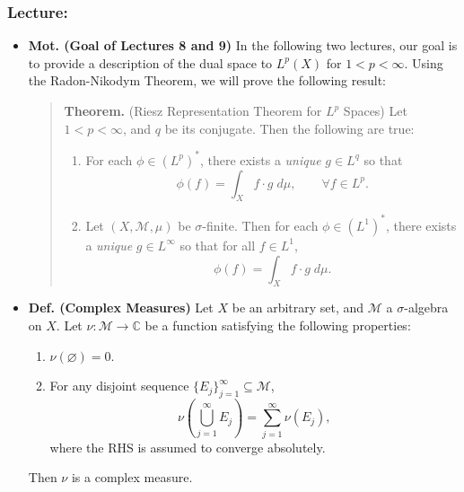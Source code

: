 \documentclass{article}
\begin{document}
\subsubsection{Lecture:}
\begin{itemize}
	\item \textbf{Mot. (Goal of Lectures 8 and 9)} In the following two lectures, our goal is to provide a description of the dual space to $L^{p}(X)$ for $1 < p < \infty$. Using the Radon-Nikodym Theorem, we will prove the following result: 
	\begin{quote}
		\textbf{Theorem.} (Riesz Representation Theorem for $L^{p}$ Spaces) Let $1 < p < \infty$, and $q$ be its conjugate. Then the following are true: \vspace{-0.15cm}
		\begin{enumerate}[itemsep =-2pt,label = (\roman{*})]
			\item For each $\phi \in (L^{p})^{\ast}$, there exists a \textit{unique} $g \in L^{q}$ so that 
			\begin{equation*}
				\phi(f) = \int_{X}f \cdot g\;d\mu, \qquad \forall f\in L^{p}. 
			\end{equation*}
			\item Let $(X, \mathscr{M},\mu)$ be $\sigma$-finite. Then for each $\phi \in (L^{1})^{\ast}$, there exists a \textit{unique} $g \in L^{\infty}$ so that for all $f \in L^{1}$, 
			\begin{equation*}
				\phi(f) = \int_{X} f \cdot g\;d\mu. 
			\end{equation*}
		\end{enumerate}
	\end{quote}
	\item \textbf{Def. (Complex Measures)} Let $X$ be an arbitrary set, and $\mathscr{M}$ a $\sigma$-algebra on $X$. Let $\nu: \mathscr{M} \to \mathbb{C}$ be a function satisfying the following properties: \vspace{-0.15cm}
	\begin{enumerate}[itemsep =-2pt,label = (\arabic{*})]
		\item $\nu(\varnothing) = 0$. 
		\item For any disjoint sequence $\{E_{j}\}_{j = 1}^{\infty} \subseteq \mathscr{M}$, 
		\begin{equation}
			\nu\left(\bigcup_{j = 1}^{\infty}E_{j}\right) = \sum_{j = 1}^{\infty}\nu(E_{j}),
		\end{equation}
		where the RHS is assumed to converge absolutely. 
	\end{enumerate}
	Then $\nu$ is a complex measure. 

\end{itemize}
\end{document}
